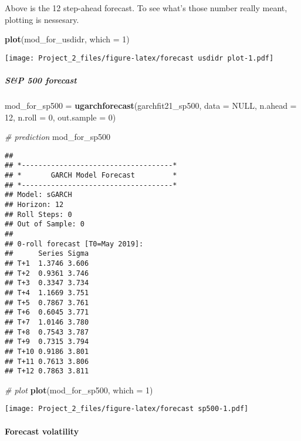 \documentclass[]{article}
\newenvironment{Shaded}{\begin{snugshade}}{\end{snugshade}}
\newcommand{\KeywordTok}[1]{\textcolor[rgb]{0.13,0.29,0.53}{\textbf{#1}}}
\newcommand{\DataTypeTok}[1]{\textcolor[rgb]{0.13,0.29,0.53}{#1}}
\newcommand{\DecValTok}[1]{\textcolor[rgb]{0.00,0.00,0.81}{#1}}
\newcommand{\StringTok}[1]{\textcolor[rgb]{0.31,0.60,0.02}{#1}}
\newcommand{\CommentTok}[1]{\textcolor[rgb]{0.56,0.35,0.01}{\textit{#1}}}
\newcommand{\OtherTok}[1]{\textcolor[rgb]{0.56,0.35,0.01}{#1}}
\newcommand{\NormalTok}[1]{#1}
\let\oldparagraph\paragraph
\renewcommand{\paragraph}[1]{\oldparagraph{#1}\mbox{}}
\let\oldsubparagraph\subparagraph
\renewcommand{\subparagraph}[1]{\oldsubparagraph{#1}\mbox{}}
\begin{document}
Above is the 12 step-ahead forecast. To see what's those number really
meant, plotting is nessesary.

\begin{Shaded}
\begin{Highlighting}[]
\KeywordTok{plot}\NormalTok{(mod_for_usdidr, }\DataTypeTok{which =} \DecValTok{1}\NormalTok{)}
\end{Highlighting}
\end{Shaded}

\texttt{[image: Project\_2\_files/figure-latex/forecast usdidr plot-1.pdf]}

\subparagraph{S\&P 500 forecast}\label{sp-500-forecast}

\begin{Shaded}
\begin{Highlighting}[]
\NormalTok{mod_for_sp500 =}\StringTok{ }\KeywordTok{ugarchforecast}\NormalTok{(garchfit21_sp500, }\DataTypeTok{data =} \OtherTok{NULL}\NormalTok{, }\DataTypeTok{n.ahead =} \DecValTok{12}\NormalTok{, }\DataTypeTok{n.roll =} \DecValTok{0}\NormalTok{, }\DataTypeTok{out.sample =} \DecValTok{0}\NormalTok{)}

\CommentTok{# prediction}
\NormalTok{mod_for_sp500}
\end{Highlighting}
\end{Shaded}

\begin{verbatim}
## 
## *------------------------------------*
## *       GARCH Model Forecast         *
## *------------------------------------*
## Model: sGARCH
## Horizon: 12
## Roll Steps: 0
## Out of Sample: 0
## 
## 0-roll forecast [T0=May 2019]:
##      Series Sigma
## T+1  1.3746 3.606
## T+2  0.9361 3.746
## T+3  0.3347 3.734
## T+4  1.1669 3.751
## T+5  0.7867 3.761
## T+6  0.6045 3.771
## T+7  1.0146 3.780
## T+8  0.7543 3.787
## T+9  0.7315 3.794
## T+10 0.9186 3.801
## T+11 0.7613 3.806
## T+12 0.7863 3.811
\end{verbatim}

\begin{Shaded}
\begin{Highlighting}[]
\CommentTok{# plot}
\KeywordTok{plot}\NormalTok{(mod_for_sp500, }\DataTypeTok{which =} \DecValTok{1}\NormalTok{)}
\end{Highlighting}
\end{Shaded}

\texttt{[image: Project\_2\_files/figure-latex/forecast sp500-1.pdf]}

\paragraph{Forecast volatility}\label{forecast-volatility}
\end{document}
